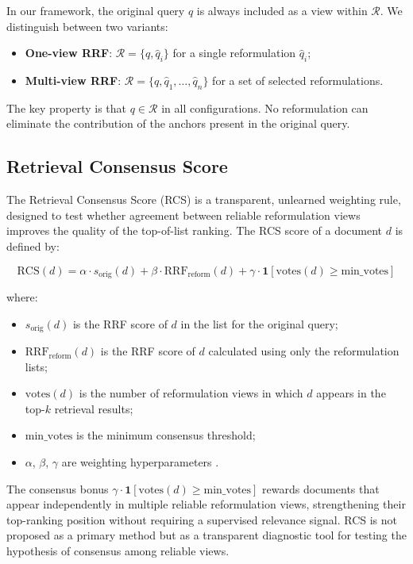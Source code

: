 \documentclass[a4paper,fleqn]{cas-dc}
\begin{document}
In our framework, the original query $q$ is always included as 
a view within $\mathcal{R}$. We distinguish between two variants:


\begin{itemize}
    \item \textbf{One-view RRF}: 
    $\mathcal{R} = \{q, \hat{q}_i\}$ for a single reformulation 
    $\hat{q}_i$;
    \item \textbf{Multi-view RRF}: 
    $\mathcal{R} = \{q, \hat{q}_1, \ldots, \hat{q}_n\}$ for a 
    set of selected reformulations.
\end{itemize}

The key property is that $q \in \mathcal{R}$ in all 
configurations. No reformulation can eliminate the 
contribution of the anchors present in the original query.

\subsection{Retrieval Consensus Score}

The Retrieval Consensus Score (RCS) is a transparent, 
unlearned weighting rule, designed to test whether agreement between 
reliable reformulation views improves the quality of the top-of-list 
ranking. The RCS score of a document $d$ is defined by:

\begin{equation}
    \text{RCS}(d) = \alpha \cdot s_{\text{orig}}(d) +
    \beta \cdot \text{RRF}_{\text{reform}}(d) +
    \gamma \cdot \mathbf{1}\left[\text{votes}(d)
    \geq \text{min\_votes}\right]
    \label{eq:rcs}
\end{equation}


where:
\begin{itemize}
    \item $s_{\text{orig}}(d)$ is the RRF score of $d$ in the list 
    for the original query;
    \item $\text{RRF}_{\text{reform}}(d)$ is the RRF score of $d$ 
    calculated using only the reformulation lists;
    \item $\text{votes}(d)$ is the number of reformulation views 
    in which $d$ appears in the top-$k$ retrieval results;
    \item $\text{min\_votes}$ is the minimum consensus threshold;
    \item $\alpha$, $\beta$, $\gamma$ are weighting hyperparameters 
    .
\end{itemize}

The consensus bonus $\gamma \cdot \mathbf{1}[\text{votes}(d) \geq 
\text{min\_votes}]$ rewards documents that appear 
independently in multiple reliable reformulation views, 
strengthening their top-ranking position without requiring a 
supervised relevance signal. RCS is not proposed as a primary method 
but as a transparent diagnostic tool for 
testing the hypothesis of consensus among reliable views.
\end{document}
